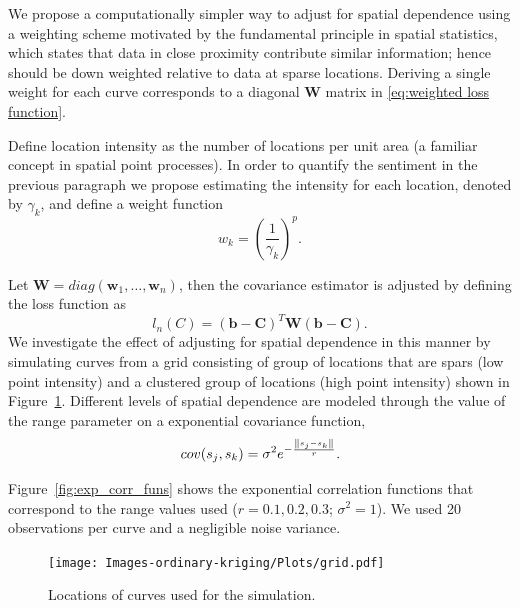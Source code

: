 
We propose a computationally simpler way to adjust for spatial dependence using a weighting scheme motivated by the fundamental principle in spatial statistics, which states that data in close proximity contribute similar information; hence should be down weighted relative to data at sparse locations. Deriving a single weight for each curve corresponds to a diagonal $\mathbf{W}$ matrix in \eqref{eq:weighted loss function}. 

Define location intensity as the number of locations per unit area (a familiar concept in spatial point processes). In order to quantify the sentiment in the previous paragraph we propose estimating the intensity for each location, denoted by $\gamma_k$, and define a weight function 
\begin{equation}
	w_k = \left(\frac{1}{\gamma_k}\right)^p. 
\end{equation}

Let $\mathbf{W} = diag(\mathbf{w}_1, \dots, \mathbf{w}_n)$, then the covariance estimator is adjusted by defining the loss function as 
\begin{equation}
	l_{n}(C)= (\mathbf{b} - \mathbf{C})^T\mathbf{W}(\mathbf{b} - \mathbf{C}). \label{eq:diag weighted loss function} 
\end{equation}
We investigate the effect of adjusting for spatial dependence in this manner by simulating curves from a grid consisting of group of locations that are spars (low point intensity) and a clustered group of locations (high point intensity) shown in Figure~\ref{fig:grid3}. Different levels of spatial dependence are modeled through the value of the range parameter on a exponential covariance function,
\begin{equation}
	cov(s_j, s_k) = \sigma^2e^{-\frac{\left\|s_j - s_k\right\|}{r}}. 
\end{equation}

Figure~\ref{fig:exp_corr_funs} shows the exponential correlation functions that correspond to the range values used ($r = 0.1, 0.2, 0.3$; $\sigma^2=1$). We used 20 observations per curve and a negligible noise variance. 

\begin{figure}
	\begin{center}
		\texttt{[image: Images-ordinary-kriging/Plots/grid.pdf]} 
	\end{center}
	\caption{Locations of curves used for the simulation.} \label{fig:grid3} 
\end{figure}

